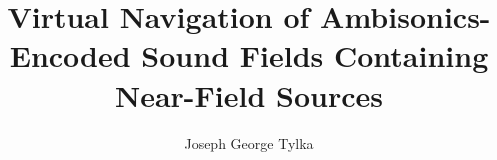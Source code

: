 \documentclass[12pt,lof,lot]{puthesis}
\title{Virtual Navigation of Ambisonics-Encoded Sound Fields Containing Near-Field Sources}
\author{Joseph George Tylka}
\begin{document}
\renewcommand\listfigurename{List of figures}
\renewcommand\listtablename{List of tables}

\makefrontmatter













\appendix %
%
%

\singlespacing
%
%
\sloppy
\printbibliography[heading=bibintoc]
\end{document}
